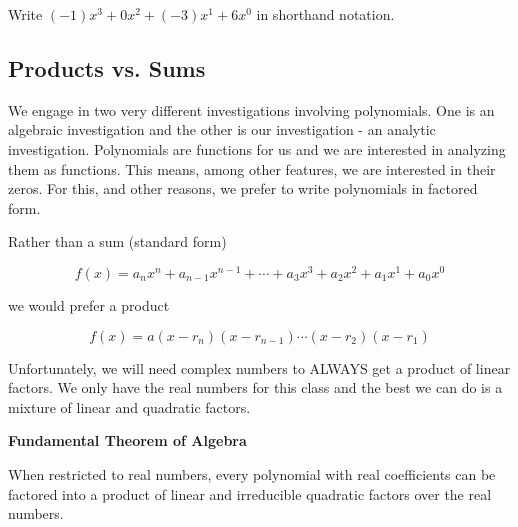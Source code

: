 \documentclass{ximera}
\begin{document}
\begin{question}

Write $(-1) x^3 + 0 x^2 + (-3) x^1 + 6 x^0$ in shorthand notation.


\begin{multipleChoice}
\end{multipleChoice}

\end{question}










\subsection{Products vs. Sums}


We engage in two very different investigations involving polynomials.  One is an algebraic investigation and the other is our investigation - an analytic investigation.  Polynomials are functions for us and we are interested in analyzing them as functions.  This means, among other features, we are interested in their zeros.  For this, and other reasons, we prefer to write polynomials in factored form.



Rather than a sum (standard form)

\[   f(x) = a_n x^n + a_{n-1} x^{n-1} + \cdots + a_3 x^3 + a_2 x^2 + a_1 x^1 + a_0 x^0      \]

we would prefer a product

\[   f(x) = a (x-r_n)(x-r_{n-1})  \cdots (x-r_2)(x-r_1)  \]





Unfortunately, we will need complex numbers to ALWAYS get a product of linear factors.  We only have the real numbers for this class and the best we can do is a mixture of linear and quadratic factors.



\begin{theorem} \textbf{\textcolor{green!50!black}{Fundamental Theorem of Algebra}}

When restricted to real numbers, every polynomial with real coefficients can be factored into a product of linear and irreducible quadratic factors over the real numbers.

\end{theorem}
\end{document}
